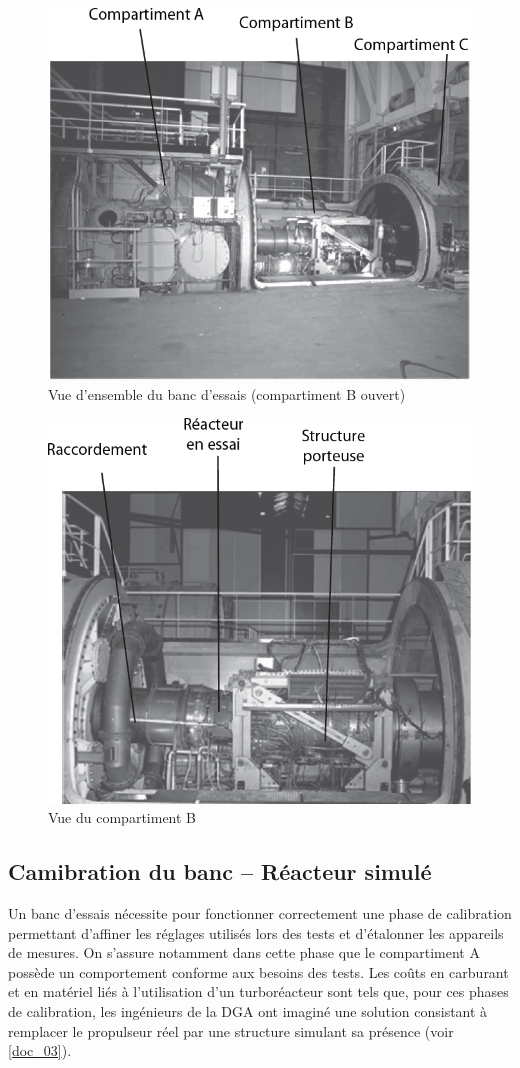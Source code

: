 \documentclass[10pt,fleqn]{article} %
\begin{document}
\begin{multicols}{2}
\begin{figure}[H]
\centering
\includegraphics[width=.8\linewidth]{img_02}
\caption{\label{img_02} Vue d'ensemble du banc d'essais (compartiment B ouvert)}
\end{figure}

\begin{figure}[H]
\centering
\includegraphics[width=.8\linewidth]{img_03}
\caption{\label{img_03} Vue du compartiment B}
\end{figure}


\subsection{Camibration du banc -- Réacteur simulé}
	Un banc d'essais nécessite pour fonctionner correctement une phase de calibration permettant d'affiner les réglages utilisés lors des tests et d'étalonner les appareils de mesures. On s'assure notamment dans cette phase que le compartiment A possède un comportement conforme aux besoins des tests.
	Les coûts en carburant et en matériel liés à l'utilisation d'un turboréacteur sont tels que, pour ces phases de calibration, les ingénieurs de la DGA ont imaginé une solution consistant à remplacer le propulseur réel par une structure simulant sa présence (voir \autoref{doc_03}).


\end{multicols}
\end{document}
